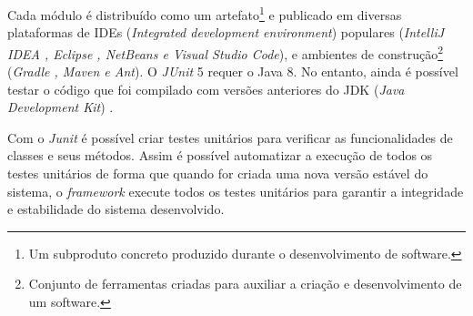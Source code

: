 Cada módulo é distribuído como um artefato\footnote{Um subproduto concreto produzido durante o desenvolvimento de software.} e publicado em diversas plataformas de IDEs (\textit{Integrated development environment}) populares (\textit{IntelliJ IDEA , Eclipse , NetBeans e Visual Studio Code}), e ambientes de construção\footnote{Conjunto de ferramentas criadas para auxiliar a criação e desenvolvimento de um software.} (\textit{Gradle , Maven e Ant}). O \textit{JUnit} 5 requer o Java 8. No entanto, ainda é possível testar o código que foi compilado com versões anteriores do JDK (\textit{Java Development Kit}) \cite{Junit}.


Com o \textit{Junit} é possível criar testes unitários para verificar as funcionalidades de classes e seus métodos. Assim é possível automatizar a execução de todos os testes unitários de forma que quando for criada uma nova versão estável do sistema, o \textit{framework} execute todos os testes unitários para garantir a integridade e estabilidade do sistema desenvolvido.






  

